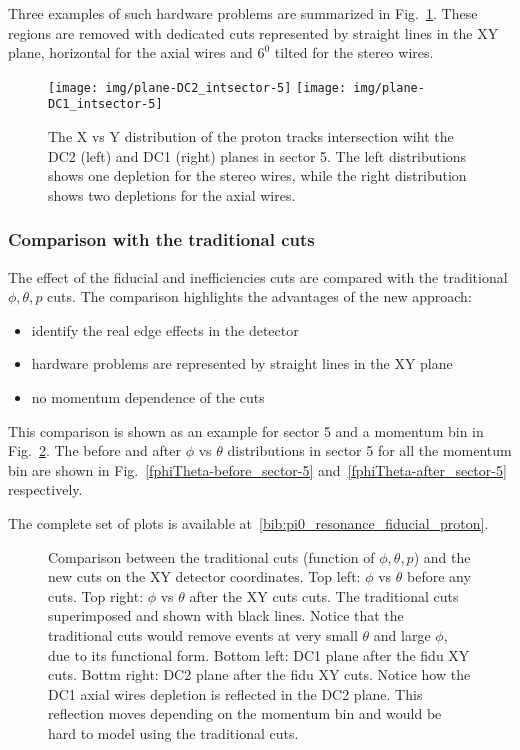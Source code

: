 Three examples of such hardware problems are summarized in Fig.~\ref{fig:xy_dc12_s5}.
These regions are removed with dedicated cuts represented by straight lines in the XY plane,
horizontal for the axial wires and $6^0$ tilted for the stereo wires.


\begin{figure}[ht]
    \centering
    \texttt{[image: img/plane-DC2\_intsector-5]}
    \texttt{[image: img/plane-DC1\_intsector-5]}
    \caption{The X vs Y distribution of the proton tracks intersection wiht the DC2 (left)
        and DC1 (right) planes in sector 5. The left distributions shows one depletion for the stereo wires,
        while the right distribution shows two depletions for the axial wires.}
    \label{fig:xy_dc12_s5}
\end{figure}

\subsubsection{Comparison with the traditional cuts}

The effect of the fiducial and inefficiencies cuts are compared with the traditional $\phi, \theta, p$ cuts.
The comparison highlights the advantages of the new approach:

\begin{itemize}
    \item identify the real edge effects in the detector
    \item hardware problems are represented by straight lines in the XY plane
    \item no momentum dependence of the cuts
\end{itemize}
This comparison is shown as an example for sector 5 and a momentum bin in Fig.~\ref{fig:PnPvsTmom-3.8_sector-5_plot-phiVsTheta}.
The before and after $\phi$ vs $\theta$ distributions in sector 5 for all the momentum bin are shown in Fig.~\ref{fphiTheta-before_sector-5}
and~\ref{fphiTheta-after_sector-5} respectively.

The complete set of plots is available at~\ref{bib:pi0_resonance_fiducial_proton}.

\begin{figure}[ht]
    \centering
    \caption{Comparison between the traditional cuts (function of $\phi, \theta, p$) and the new cuts on the XY detector coordinates.
    Top left:  $\phi$ vs $\theta$ before any cuts. Top right:  $\phi$ vs $\theta$ after the XY cuts cuts. The traditional cuts superimposed
    and shown with black lines. Notice that the traditional cuts would remove events at very small $\theta$ and large $\phi$, due to its functional form.
    Bottom left: DC1 plane after the fidu XY cuts. Bottm right: DC2 plane after the fidu XY cuts.
    Notice how the DC1 axial wires depletion is reflected in the DC2 plane. This reflection moves depending on the momentum bin and would be hard to model
    using the traditional cuts.}
    \label{fig:PnPvsTmom-3.8_sector-5_plot-phiVsTheta}
\end{figure}




